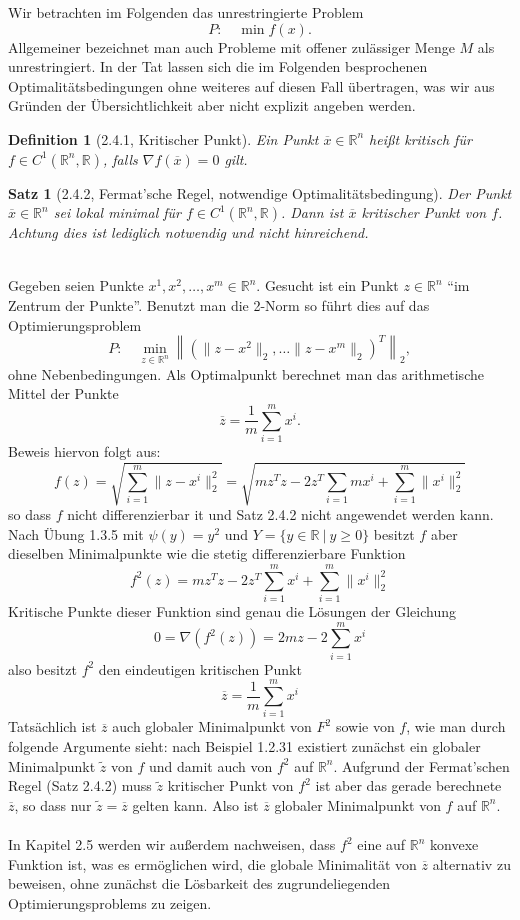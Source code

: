 \documentclass[12pt]{extreport} %
\newcommand{\R}{\mathbb{R}}
\theoremstyle{named}
\theoremstyle{nnamed}
\theoremstyle{itshape}
\newtheorem*{satz}{Satz}
\newtheorem*{definition}{Definition}
\theoremstyle{normal}
\begin{document}
Wir betrachten im Folgenden das unrestringierte Problem 
$$ P: \quad \min f(x). $$
Allgemeiner bezeichnet man auch Probleme mit offener zulässiger Menge $M$ als unrestringiert. In der Tat lassen sich die im Folgenden besprochenen Optimalitätsbedingungen ohne weiteres auf diesen Fall übertragen, was wir aus Gründen der Übersichtlichkeit aber nicht explizit angeben werden.

\begin{definition}[2.4.1, Kritischer Punkt]
	Ein Punkt $\overline{x} \in \R^n$ heißt kritisch für $f \in C^1(\R^n, \R)$, falls $\nabla f(\overline{x}) = 0$ gilt.	
\end{definition}

\begin{satz}[2.4.2, Fermat'sche Regel, notwendige Optimalitätsbedingung]
	Der Punkt $\overline{x} \in \R^n$ sei lokal minimal für $f \in C^1(\R^n, \R)$. Dann ist $\overline{x}$ kritischer Punkt von $f$. Achtung dies ist lediglich notwendig und nicht hinreichend.
\end{satz}

\begin{beispiel} ~\\
	Gegeben seien Punkte $x^1, x^2, \dotsc, x^m \in \R^n$. Gesucht ist ein Punkt $z \in \R^n$ \enquote{im Zentrum der Punkte}. Benutzt man die 2-Norm so führt dies auf das Optimierungsproblem
		$$ P: \quad \min_{z \in \R^n} \left\| \left( \| z - x^2 \|_2, \dotsc \| z - x^m \|_2 \right)^T \right\|_2, $$
	ohne Nebenbedingungen. Als Optimalpunkt berechnet man das arithmetische Mittel der Punkte
	$$ \overline{z} = \frac{1}{m} \sum_{i=1}^m x^i. $$
	Beweis hiervon folgt aus:
	$$ f(z) = \sqrt{ \sum_{i=1}^{m} \| z - x^i \|_2^2} = \sqrt{ m z^T z - 2 z^T \sum_{i=1}{m} x^i + \sum_{i=1}^{m} \| x^i \|_2^2} $$
	so dass $f$ nicht differenzierbar it und Satz 2.4.2 nicht angewendet werden kann. Nach Übung 1.3.5 mit $\psi(y) = y^2$ und $Y = \{ y \in \R ~|~y \geq 0  \}$ besitzt $f$ aber dieselben Minimalpunkte wie die stetig differenzierbare Funktion
	$$ f^2(z) = mz^Tz - 2z^T \sum_{i=1}^{m} x^i + \sum_{i=1}^{m} \| x^i \|_2^2 $$
	Kritische Punkte dieser Funktion sind genau die Lösungen der Gleichung 
	$$ 0 = \nabla \left( f^2(z) \right) = 2 mz - 2 \sum_{i=1}^m x^i $$
	also besitzt $f^2$ den eindeutigen kritischen Punkt
	$$ \overline{z} = \frac{1}{m} \sum_{i=1}^{m} x^i $$
	Tatsächlich ist $\overline{z}$ auch globaler Minimalpunkt von $F^2$ sowie von $f$, wie man durch folgende Argumente sieht: nach Beispiel 1.2.31 existiert zunächst ein globaler Minimalpunkt $\tilde{z}$ von $f$ und damit auch von $f^2$ auf $\R^n$. Aufgrund der Fermat'schen Regel (Satz 2.4.2) muss $\tilde{z}$ kritischer Punkt von $f^2$ ist aber das gerade berechnete $\overline{z}$, so dass nur $\tilde{z} = \overline{z}$ gelten kann. Also ist $\overline{z}$ globaler Minimalpunkt von $f$ auf $\R^n$. ~\\
	
	In Kapitel 2.5 werden wir außerdem nachweisen, dass $f^2$ eine auf $\R^n$ konvexe Funktion ist, was es ermöglichen wird, die globale Minimalität von $\overline{z}$ alternativ zu beweisen, ohne zunächst die Lösbarkeit des zugrundeliegenden Optimierungsproblems zu zeigen.
\end{beispiel}
\end{document}
